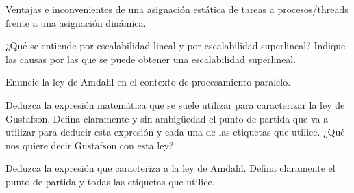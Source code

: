 \begin{cuestion}
    Ventajas e inconvenientes de una asignación estática de tareas a procesos/threads frente a una
    asignación dinámica.
\end{cuestion}

\begin{cuestion}
    ¿Qué se entiende por escalabilidad lineal y por escalabilidad superlineal? Indique las causas por
    las que se puede obtener una escalabilidad superlineal.
\end{cuestion}

\begin{cuestion}
    Enuncie la ley de Amdahl en el contexto de procesamiento paralelo.
\end{cuestion}

\begin{cuestion}
    Deduzca la expresión matemática que se suele utilizar para caracterizar la ley de Gustafson.
    Defina claramente y sin ambigüedad el punto de partida que va a utilizar para deducir esta expresión y cada
    una de las etiquetas que utilice. ¿Qué nos quiere decir Gustafson con esta ley?
\end{cuestion}

\begin{cuestion}
    Deduzca la expresión que caracteriza a la ley de Amdahl. Defina claramente el punto de partida y
    todas las etiquetas que utilice.
\end{cuestion}
